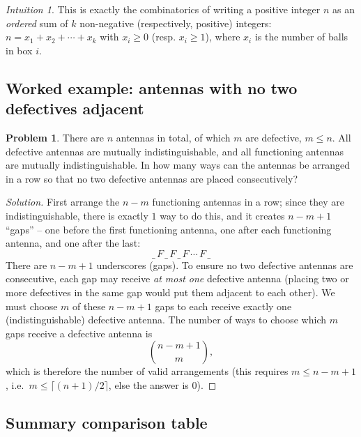 \documentclass[11pt]{article}
\theoremstyle{definition}
\newtheorem{problem}[definition]{Problem}
\theoremstyle{plain}
\theoremstyle{remark}
\newtheorem{intuition}[definition]{Intuition}
\begin{document}
\begin{intuition}
This is exactly the combinatorics of writing a positive integer $n$ as an \emph{ordered} sum of
$k$ non-negative (respectively, positive) integers: $n = x_1 + x_2 + \cdots + x_k$ with $x_i \ge 0$
(resp. $x_i \ge 1$), where $x_i$ is the number of balls in box $i$.
\end{intuition}

\subsection{Worked example: antennas with no two defectives adjacent}

\begin{problem}
There are $n$ antennas in total, of which $m$ are defective, $m \le n$. All defective antennas are
mutually indistinguishable, and all functioning antennas are mutually indistinguishable. In how
many ways can the antennas be arranged in a row so that no two defective antennas are placed
consecutively?
\end{problem}

\begin{proof}[Solution]
First arrange the $n-m$ functioning antennas in a row; since they are indistinguishable, there is
exactly $\boxed{1}$ way to do this, and it creates $n-m+1$ ``gaps'' -- one before the first
functioning antenna, one after each functioning antenna, and one after the last:
\[
\_\, F \,\_\, F \,\_\, F \,\cdots\, F \,\_
\]
There are $n-m+1$ underscores (gaps). To ensure no two defective antennas are consecutive, each
gap may receive \emph{at most one} defective antenna (placing two or more defectives in the same
gap would put them adjacent to each other). We must choose $m$ of these $n-m+1$ gaps to each
receive exactly one (indistinguishable) defective antenna. The number of ways to choose which $m$
gaps receive a defective antenna is
\[
\binom{n-m+1}{m},
\]
which is therefore the number of valid arrangements (this requires $m \le n-m+1$, i.e.\
$m \le \lceil (n+1)/2 \rceil$, else the answer is $0$).
\end{proof}

\subsection{Summary comparison table}
\end{document}
